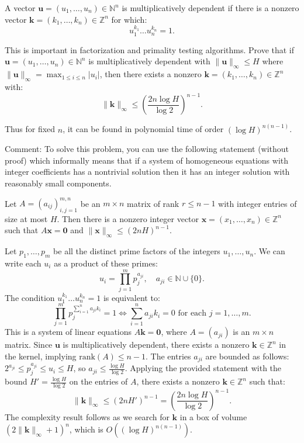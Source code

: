 \begin{exercise}
\label{applied:2016:3}
A vector $\mathbf{u}=(u_{1},\dots,u_{n})\in\mathbb{N}^{n}$ is multiplicatively dependent if there is a nonzero vector $\mathbf{k}=(k_{1},\dots,k_{n})\in\mathbb{Z}^{n}$ for which:
\[
u_{1}^{k_{1}}\dots u_{n}^{k_{n}}=1. \tag{1}
\]

This is important in factorization and primality testing algorithms. Prove that if $\mathbf{u}=(u_{1},\dots,u_{n})\in\mathbb{N}^{n}$ is multiplicatively dependent with $\|\mathbf{u}\|_{\infty}\leq H$ where $\|\mathbf{u}\|_{\infty}=\max_{1\leq i\leq n}|u_{i}|$, then there exists a nonzero $\mathbf{k}=(k_{1},\dots,k_{n})\in\mathbb{Z}^{n}$ with:
\[
\|\mathbf{k}\|_{\infty}\leq\left(\frac{2n\log H}{\log 2}\right)^{n-1}.
\]

Thus for fixed $n$, it can be found in polynomial time of order $(\log H)^{n(n-1)}$.

Comment: To solve this problem, you can use the following statement (without proof) which informally means that if a system of homogeneous equations with integer coefficients has a nontrivial solution then it has an integer solution with reasonably small components.

Let $A=(a_{ij})_{i,j=1}^{m,n}$ be an $m\times n$ matrix of rank $r\leq n-1$ with integer entries of size at most $H$. Then there is a nonzero integer vector $\mathbf{x}=(x_{1},\dots,x_{n})\in\mathbb{Z}^{n}$ such that $A\mathbf{x}=\mathbf{0}$ and $\|\mathbf{x}\|_{\infty}\leq(2nH)^{n-1}$.
\end{exercise}

\begin{solution}
Let $p_1, \dots, p_m$ be all the distinct prime factors of the integers $u_1, \dots, u_n$. We can write each $u_i$ as a product of these primes:
\[ u_i = \prod_{j=1}^m p_j^{a_{ji}}, \quad a_{ji} \in \mathbb{N} \cup \{0\}. \]
The condition $u_1^{k_1} \dots u_n^{k_n} = 1$ is equivalent to:
\[ \prod_{j=1}^m p_j^{\sum_{i=1}^n a_{ji} k_i} = 1 \iff \sum_{i=1}^n a_{ji} k_i = 0 \text{ for each } j=1, \dots, m. \]
This is a system of linear equations $A\mathbf{k} = \mathbf{0}$, where $A = (a_{ji})$ is an $m \times n$ matrix. Since $\mathbf{u}$ is multiplicatively dependent, there exists a nonzero $\mathbf{k} \in \mathbb{Z}^n$ in the kernel, implying $\text{rank}(A) \leq n-1$.
The entries $a_{ji}$ are bounded as follows: $2^{a_{ji}} \leq p_j^{a_{ji}} \leq u_i \leq H$, so $a_{ji} \leq \frac{\log H}{\log 2}$.
Applying the provided statement with the bound $H' = \frac{\log H}{\log 2}$ on the entries of $A$, there exists a nonzero $\mathbf{k} \in \mathbb{Z}^n$ such that:
\[ \|\mathbf{k}\|_\infty \leq (2nH')^{n-1} = \left( \frac{2n \log H}{\log 2} \right)^{n-1}. \]
The complexity result follows as we search for $\mathbf{k}$ in a box of volume $(2\|\mathbf{k}\|_\infty + 1)^n$, which is $O((\log H)^{n(n-1)})$.
\end{solution}

